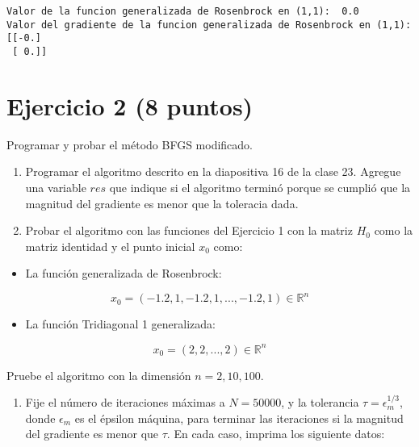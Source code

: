 \documentclass[11pt]{article}
\providecommand{\tightlist}{%
      \setlength{\itemsep}{0pt}\setlength{\parskip}{0pt}}
\begin{document}
    \begin{Verbatim}[commandchars=\\\{\}]
Valor de la funcion generalizada de Rosenbrock en (1,1):  0.0
Valor del gradiente de la funcion generalizada de Rosenbrock en (1,1):  [[-0.]
 [ 0.]]
    \end{Verbatim}

    \hypertarget{ejercicio-2-8-puntos}{%
\section{Ejercicio 2 (8 puntos)}\label{ejercicio-2-8-puntos}}

Programar y probar el método BFGS modificado.

\begin{enumerate}
\def\labelenumi{\arabic{enumi}.}
\tightlist
\item
  Programar el algoritmo descrito en la diapositiva 16 de la clase 23.
  Agregue una variable \(res\) que indique si el algoritmo terminó
  porque se cumplió que la magnitud del gradiente es menor que la
  toleracia dada.
\item
  Probar el algoritmo con las funciones del Ejercicio 1 con la matriz
  \(H_0\) como la matriz identidad y el punto inicial \(x_0\) como:
\end{enumerate}

\begin{itemize}
\tightlist
\item
  La función generalizada de Rosenbrock:
\end{itemize}

\[ x_0 = (-1.2, 1, -1.2, 1, ..., -1.2, 1) \in \mathbb{R}^n\]

\begin{itemize}
\tightlist
\item
  La función Tridiagonal 1 generalizada:
\end{itemize}

\[ x_0 = (2,2, ..., 2) \in \mathbb{R}^n \]

Pruebe el algoritmo con la dimensión \(n=2, 10 , 100\).

\begin{enumerate}
\def\labelenumi{\arabic{enumi}.}
\setcounter{enumi}{2}
\tightlist
\item
  Fije el número de iteraciones máximas a \(N=50000\), y la tolerancia
  \(\tau = \epsilon_m^{1/3}\), donde \(\epsilon_m\) es el épsilon
  máquina, para terminar las iteraciones si la magnitud del gradiente es
  menor que \(\tau\). En cada caso, imprima los siguiente datos:
\end{enumerate}
\end{document}
